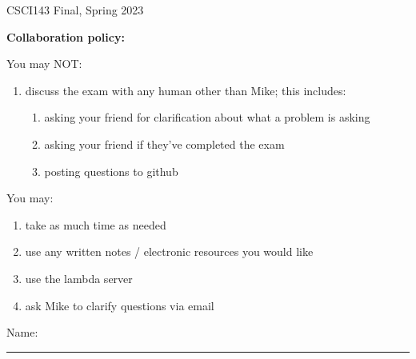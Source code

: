 \documentclass[12pt]{exam}
\theoremstyle{definition}
\begin{document}
\begin{center}
    {
\Large
    CSCI143 Final, Spring 2023
}

    \vspace{0.1in}
\end{center}

\noindent
\textbf{Collaboration policy:} 

\vspace{0.1in}
\noindent
You may NOT:
\begin{enumerate}
    \item discuss the exam with any human other than Mike; this includes:
        \begin{enumerate}
            \item asking your friend for clarification about what a problem is asking
            \item asking your friend if they've completed the exam
            \item posting questions to github
        \end{enumerate}
\end{enumerate}

\noindent
You may:
\begin{enumerate}
    \item take as much time as needed
    \item use any written notes / electronic resources you would like
    \item use the lambda server
    \item ask Mike to clarify questions via email
\end{enumerate}


\vspace{0.15in}

\vspace{0.25in}
\noindent
Name: 

\noindent
\rule{\textwidth}{0.1pt}
\vspace{0.15in}


\end{document}
